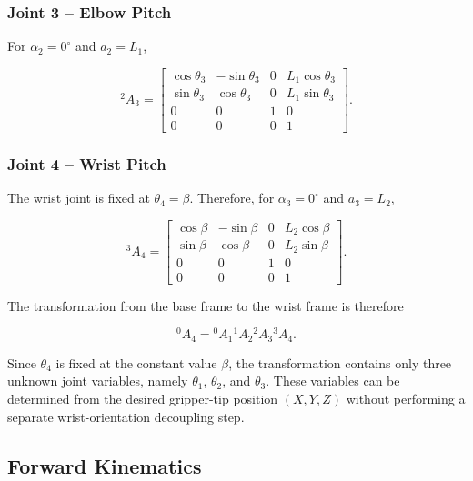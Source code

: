 \subsubsection{Joint 3 -- Elbow Pitch}

For $\alpha_2=0^\circ$ and $a_2=L_1$,

\begin{equation}
{}^2A_3 =
\begin{bmatrix}
\cos\theta_3 & -\sin\theta_3 & 0 & L_1\cos\theta_3\\
\sin\theta_3 & \cos\theta_3 & 0 & L_1\sin\theta_3\\
0 & 0 & 1 & 0\\
0 & 0 & 0 & 1
\end{bmatrix}.
\label{eq:a3}
\end{equation}

\subsubsection{Joint 4 -- Wrist Pitch}

The wrist joint is fixed at $\theta_4=\beta$. Therefore, for $\alpha_3=0^\circ$ and $a_3=L_2$,

\begin{equation}
{}^3A_4 =
\begin{bmatrix}
\cos\beta & -\sin\beta & 0 & L_2\cos\beta\\
\sin\beta & \cos\beta & 0 & L_2\sin\beta\\
0 & 0 & 1 & 0\\
0 & 0 & 0 & 1
\end{bmatrix}.
\label{eq:a4}
\end{equation}

The transformation from the base frame to the wrist frame is therefore

\begin{equation}
{}^0A_4 =
{}^0A_1
{}^1A_2
{}^2A_3
{}^3A_4.
\label{eq:a04}
\end{equation}

Since $\theta_4$ is fixed at the constant value $\beta$, the transformation contains only three unknown joint variables, namely $\theta_1$, $\theta_2$, and $\theta_3$. These variables can be determined from the desired gripper-tip position $(X,Y,Z)$ without performing a separate wrist-orientation decoupling step.

\subsection{Forward Kinematics}

